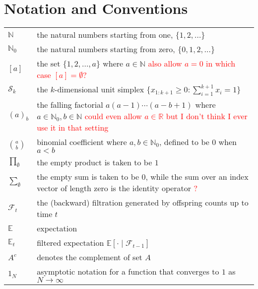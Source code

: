 \documentclass[oneside]{scrbook} %
\newcommand{\seb}[1]{\xspace\textcolor{red}{#1}\xspace} %
\theoremstyle{definition}
\newcommand{\E}{\mathbb{E}}
\newcommand{\Et}{\mathbb{E}_t}
\newcommand{\1}[1]{\mathbbm{1}_{#1}}
\begin{document}
\chapter{Notation and Conventions}
\begin{tabular}{p{} p{}}
$\mathbb{N}$ & the natural numbers starting from one, $\{1,2,\dots \}$ \\
$\mathbb{N}_0$ & the natural numbers starting from zero, $\{0,1,2,\dots \}$ \\
$[a]$ & the set $\{1,2,\dots,a\}$ where $a\in\mathbb{N}$ \seb{also allow $a=0$ in which case $[a] = \emptyset$?} \\
$\mathcal{S}_k$ & the $k$-dimensional unit simplex $\{ x_{1:k+1} \geq 0 : \sum_{i=1}^{k+1} x_i = 1 \}$ \\
$(a)_b$ & the falling factorial $a (a-1) \cdots (a-b+1)$ 
    where $a \in \mathbb{N}_0, b \in \mathbb{N}$ \seb{could even allow $a\in\mathbb{R}$ but I don't think I ever use it in that setting} \\
$\binom{a}{b}$ & binomial coefficient where $a,b \in \mathbb{N}_0$, defined to be $0$ when $a<b$ \\
$\prod_{\emptyset}$ & the empty product is taken to be $1$ \\
$\sum_{\emptyset}$ & the empty sum is taken to be $0$, while the sum over
    an index vector of length zero is the identity operator \seb{?} \\
$\mathcal{F}_{t}$ & the (backward) filtration generated by offspring counts 
    up to time $t$ \\
$\E$ & expectation \\
$\Et$ & filtered expectation $\E[ \cdot \mid \mathcal{F}_{t-1}]$\\
$A^c$ & denotes the complement of set $A$\\
$1_N$ & asymptotic notation for a function that converges to $1$ as $N\to\infty$ \\
\end{tabular}


\mainmatter











\backmatter


\printbibliography
\end{document}
